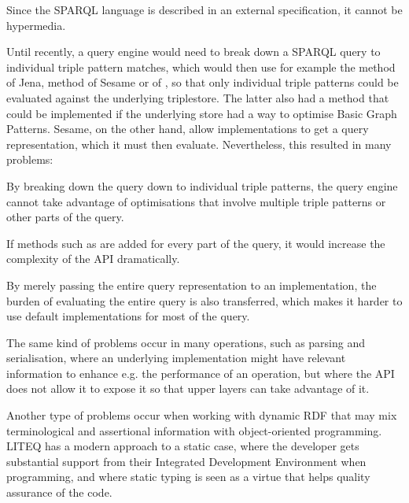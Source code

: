 \begin{problem}\label{prob:tpf}
Since the SPARQL language is described in an external specification,
it cannot be hypermedia.
\end{problem}

Until recently, a query engine would need to break down a SPARQL query
to individual triple pattern matches, which would then use for example
the  method of Jena,  method
of Sesame or  of , so that only
individual triple patterns could be evaluated against the underlying
triplestore.  The latter also had a  method that
could be implemented if the underlying store had a way to optimise
Basic Graph Patterns. Sesame, on the other hand, allow implementations
to get a query representation, which it must then evaluate.
Nevertheless, this resulted in many problems:

\begin{problem}\label{prob:breakdown}
By breaking down the query down to individual triple patterns, the
query engine cannot take advantage of optimisations that involve
multiple triple patterns or other parts of the query.
\end{problem}

\begin{problem}\label{prob:complexapi}
If methods such as  are added for every part of the
query, it would increase the complexity of the API dramatically.
\end{problem}

\begin{problem}\label{prob:dontjustpass}
By merely passing the entire query representation to an
implementation, the burden of evaluating the entire query is also
transferred, which makes it harder to use default implementations for
most of the query.
\end{problem}

The same kind of problems occur in many operations, such as parsing
and serialisation, where an underlying implementation might have
relevant information to enhance e.g. the performance of an operation,
but where the API does not allow it to expose it so that upper layers
can take advantage of it.

Another type of problems occur when working with dynamic RDF that may
mix terminological and assertional information with object-oriented
programming. LITEQ \cite{leinberger2014semantic} has a modern approach
to a static case, where the developer gets substantial support from
their Integrated Development Environment when programming, and where
static typing is seen as a virtue that helps quality assurance of the
code.

